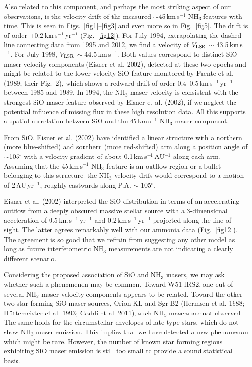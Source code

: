 \documentclass[oldversion]{aa}
\begin{document}
Also related to this component, and perhaps the most striking 
aspect of our observations, is the velocity drift of the measured 
$\sim$45\,km\,s$^{-1}$ NH$_3$ features with time. This is seen in
Figs.~\ref{fig1}--\ref{fig3} and even more so in Fig.~\ref{fig5}. 
The drift is of order +0.2\,km\,s$^{-1}$\,yr$^{-1}$ (Fig.~\ref{fig12}). 
For July 1994, extrapolating the dashed line connecting data from 1995 
and 2012, we find a velocity of $V_{\rm LSR}$ $\sim$ 43.5\,km\,s$^{-1}$.
For July 1998, $V_{\rm LSR}$ $\sim$ 44.5\,km\,s$^{-1}$. Both 
values correspond to distinct SiO maser velocity components (Eisner 
et al. 2002), detected at these two epochs and might be related to
the lower velocity SiO feature monitored by Fuente et al. (1989; their 
Fig.~2), which shows a redward drift of order 0.4--0.5\,km\,s$^{-1}$\,yr$^{-1}$
between 1985 and 1989. In 1994, the NH$_3$ maser velocity is 
consistent with the strongest SiO maser feature observed by Eisner
et al. (2002), if we neglect the potential influence of missing flux 
in these high resolution data. All this supports a spatial 
correlation between SiO and the 45\,km\,s$^{-1}$ NH$_3$ maser 
component.

From SiO, Eisner et al. (2002) have identified a linear structure with 
a northern (more blue-shifted) and southern (more red-shifted) arm 
along a position angle of $\sim$105$^{\circ}$ with a velocity 
gradient of about 0.1\,km\,s$^{-1}$\,AU$^{-1}$ along each arm.
Assuming that the 45\,km\,s$^{-1}$ NH$_3$ feature is an outflow
region or a bullet belonging to this structure, the NH$_3$ velocity 
drift would correspond to a motion of 2\,AU\,yr$^{-1}$, roughly 
eastwards along P.A. $\sim$ 105$^{\circ}$. 

Eisner et al. (2002) interpreted the SiO distribution in terms of 
an accelerating outflow from a deeply obscured massive stellar 
source with a 3-dimensional acceleration of 
0.5\,km\,s$^{-1}$\,yr$^{-1}$ and 0.2\,km\,s$^{-1}$\,yr$^{-1}$
projected along the line-of-sight. The latter agrees remarkably well
with our ammonia data (Fig.~\ref{fig12}). The agreement is so 
good that we refrain from suggesting any other model as long
as future interferometric NH$_3$ measurements are not indicating a 
clearly different scenario.

Considering the proposed association of SiO and NH$_3$ masers,
we may ask whether such a phenomenon may be common. Toward
W51-IRS2, one out of several NH$_3$ maser velocity 
components appears to be related. Toward the other two
star forming SiO maser sources, Orion-KL and Sgr B2
(Hermsen et al. 1988; H{\"u}ttemeister et al. 1993; Goddi
et al. 2011), such NH$_3$ masers are not observed. The same 
holds for the circumstellar envelopes of late-type stars, 
which do not show NH$_3$ maser emission. This implies that 
we have detected a new phenomenon which might be rare. However, 
the number of known star forming regions exhibiting SiO maser 
emission is still too small to provide a sound statistical basis. 
\end{document}
